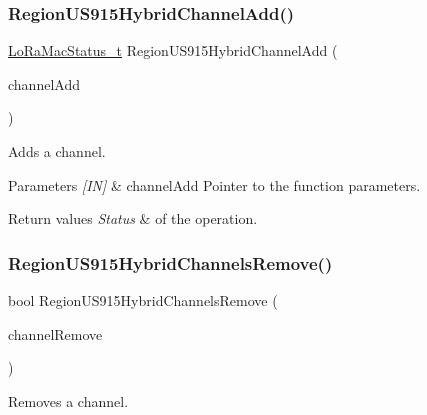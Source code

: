 \subsubsection{\texorpdfstring{Region\+U\+S915\+Hybrid\+Channel\+Add()}{RegionUS915HybridChannelAdd()}}
{\footnotesize\ttfamily \hyperlink{group__LORAMAC_ga30bd25657e10480f8605ee951b0ecfbd}{Lo\+Ra\+Mac\+Status\+\_\+t} Region\+U\+S915\+Hybrid\+Channel\+Add (\begin{DoxyParamCaption}\item[{\hyperlink{group__REGION_gab1c5f3aa06614283202906cef4417860}{Channel\+Add\+Params\+\_\+t} $\ast$}]{channel\+Add }\end{DoxyParamCaption})}



Adds a channel. 


\begin{DoxyParams}{Parameters}
{\em \mbox{[}\+I\+N\mbox{]}} & channel\+Add Pointer to the function parameters.\\
\hline
\end{DoxyParams}

\begin{DoxyRetVals}{Return values}
{\em Status} & of the operation. \\
\hline
\end{DoxyRetVals}
\mbox{\label{group__REGIONUS915HYB_ga01abfdc17109559ec3375226baf72331}} 
\subsubsection{\texorpdfstring{Region\+U\+S915\+Hybrid\+Channels\+Remove()}{RegionUS915HybridChannelsRemove()}}
{\footnotesize\ttfamily bool Region\+U\+S915\+Hybrid\+Channels\+Remove (\begin{DoxyParamCaption}\item[{\hyperlink{group__REGION_gaa37468560d2fc81a977b57a48e5d72c0}{Channel\+Remove\+Params\+\_\+t} $\ast$}]{channel\+Remove }\end{DoxyParamCaption})}



Removes a channel. 


